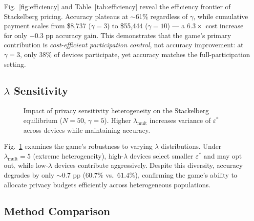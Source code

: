 Fig.~\ref{fig:efficiency} and Table~\ref{tab:efficiency} reveal the
efficiency frontier of Stackelberg pricing.
Accuracy plateaus at $\sim$61\% regardless of $\gamma$, while
cumulative payment scales from \$8{,}737 ($\gamma = 3$) to
\$55{,}444 ($\gamma = 10$) --- a $6.3\times$ cost increase for only
$+0.3$ pp accuracy gain.
This demonstrates that the game's primary contribution is
\emph{cost-efficient participation control}, not accuracy improvement:
at $\gamma = 3$, only 38\% of devices participate, yet accuracy
matches the full-participation setting.

\subsection{$\lambda$ Sensitivity}\label{sec:lambda}

\begin{figure}[t]
\centering
\caption{Impact of privacy sensitivity heterogeneity on the
Stackelberg equilibrium ($N = 50$, $\gamma = 5$).
Higher $\lambda_\text{mult}$ increases variance of $\varepsilon^*$
across devices while maintaining accuracy.}
\label{fig:lambda}
\end{figure}

Fig.~\ref{fig:lambda} examines the game's robustness to varying
$\lambda$ distributions.
Under $\lambda_\text{mult} = 5$ (extreme heterogeneity), high-$\lambda$
devices select smaller $\varepsilon^*$ and may opt out, while
low-$\lambda$ devices contribute aggressively.
Despite this diversity, accuracy degrades by only $\sim$0.7 pp
($60.7\%$ vs.\ $61.4\%$), confirming the game's ability to
allocate privacy budgets efficiently across heterogeneous populations.

\subsection{Method Comparison}\label{sec:accuracy}


